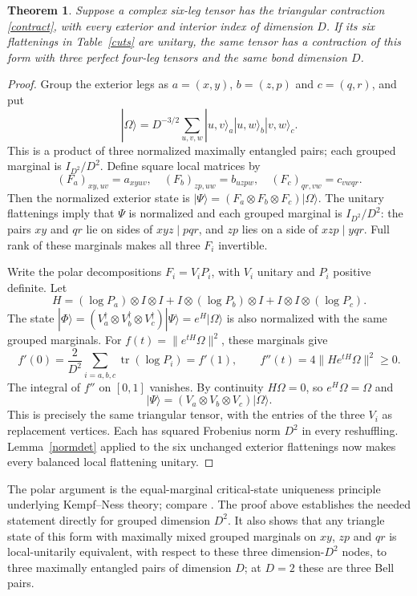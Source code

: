 \documentclass[11pt]{article}
\newtheorem{theorem}{Theorem}
\begin{document}
\begin{theorem}\label{replacement}
Suppose a complex six-leg tensor has the triangular contraction
\eqref{contract}, with every exterior and interior index of dimension
$D$. If its six flattenings in Table~\ref{cuts} are unitary, the same
tensor has a contraction of this form with three perfect four-leg
tensors and the same bond dimension $D$.
\end{theorem}
\begin{proof}
Group the exterior legs as $a=(x,y)$, $b=(z,p)$ and $c=(q,r)$, and put
\[
 |\Omega\rangle=D^{-3/2}\sum_{u,v,w}
 |u,v\rangle_a|u,w\rangle_b|v,w\rangle_c.
\]
This is a product of three normalized maximally entangled pairs; each
grouped marginal is $I_{D^2}/D^2$. Define square local matrices by
\[
 (F_a)_{xy,uv}=a_{xyuv},\quad
 (F_b)_{zp,uw}=b_{uzpw},\quad
 (F_c)_{qr,vw}=c_{vwqr}.
\]
Then the normalized exterior state is
$|\Psi\rangle=(F_a\otimes F_b\otimes F_c)|\Omega\rangle$.
The unitary flattenings imply that $\Psi$ is normalized and each grouped
marginal is $I_{D^2}/D^2$: the pairs $xy$ and $qr$ lie on sides of
$xyz\mid pqr$, and $zp$ lies on a side of $xzp\mid yqr$.
Full rank of these marginals makes all three $F_i$ invertible.

Write the polar decompositions $F_i=V_iP_i$, with $V_i$ unitary and
$P_i$ positive definite. Let
\[
 H=(\log P_a)\otimes I\otimes I+
 I\otimes(\log P_b)\otimes I+
 I\otimes I\otimes(\log P_c).
\]
The state $|\Phi\rangle=(V_a^\dagger\otimes V_b^\dagger\otimes
V_c^\dagger)|\Psi\rangle=e^H|\Omega\rangle$ is also normalized with
the same grouped marginals. For $f(t)=\|e^{tH}\Omega\|^2$, these
marginals give
\[
 f'(0)=\frac{2}{D^2}\sum_{i=a,b,c}\operatorname{tr}(\log P_i)
       =f'(1),\qquad
 f''(t)=4\|He^{tH}\Omega\|^2\ge0.
\]
The integral of $f''$ on $[0,1]$ vanishes. By continuity $H\Omega=0$,
so $e^H\Omega=\Omega$ and
\[
 |\Psi\rangle=(V_a\otimes V_b\otimes V_c)|\Omega\rangle.
\]
This is precisely the same triangular tensor, with the entries of the
three $V_i$ as replacement vertices. Each has squared Frobenius norm
$D^2$ in every reshuffling. Lemma~\ref{normdet} applied to the six
unchanged exterior flattenings now makes every balanced local
flattening unitary.
\end{proof}

The polar argument is the equal-marginal critical-state uniqueness
principle underlying Kempf--Ness theory; compare
\cite[Theorem 2 and the following paragraph]{GKW}. The proof above
establishes the needed statement directly for grouped dimension $D^2$.
It also shows that any triangle state of this form with maximally mixed
grouped marginals on $xy$, $zp$ and $qr$ is local-unitarily equivalent,
with respect to these three dimension-$D^2$ nodes, to three maximally
entangled pairs of dimension $D$; at $D=2$ these are three Bell pairs.
\end{document}
